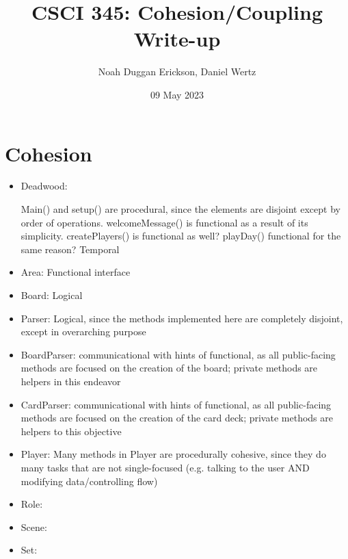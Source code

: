 \documentclass[letterpaper, twoside]{report}
\title{CSCI 345: Cohesion/Coupling Write-up}
\author{Noah Duggan Erickson, Daniel Wertz}
\date{09 May 2023}
\begin{document}
\maketitle

\chapter{Cohesion}
\begin{itemize}
    \item Deadwood:

    Main() and setup() are procedural, since the elements are disjoint except by order of operations. welcomeMessage() is functional as a result of its simplicity. createPlayers() is functional as well? playDay() functional for the same reason?
    Temporal 
    \item Area: Functional interface
    \item Board: Logical
    \item Parser: Logical, since the methods implemented here are completely disjoint, except in overarching purpose
    \item BoardParser: communicational with hints of functional, as all public-facing methods are focused on the creation of the board; private methods are helpers in this endeavor
    \item CardParser: communicational with hints of functional, as all public-facing methods are focused on the creation of the card deck; private methods are helpers to this objective
    \item Player: Many methods in Player are procedurally cohesive, since they do many tasks that are not single-focused (e.g. talking to the user AND modifying data/controlling flow)
    \item Role:
    \item Scene:
    \item Set:
\end{itemize}
\end{document}
